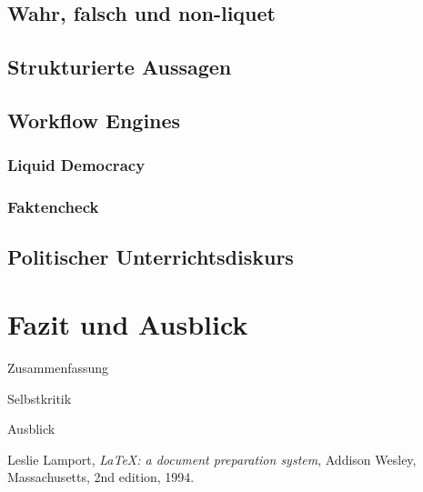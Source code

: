\documentclass[11pt,a4paper,bibtotocnumbered]{scrreprt}
\begin{document}
\section{Wahr, falsch und non-liquet} %

\section{Strukturierte Aussagen} %

\section{Workflow Engines} %

\subsection{Liquid Democracy} %

\subsection{Faktencheck} %


\section{Politischer Unterrichtsdiskurs} %



\chapter{Fazit und Ausblick} %

Zusammenfassung

Selbstkritik

Ausblick

 







\begin{singlespace}
\begin{thebibliography}{9}

  Leslie Lamport,
  \emph{\LaTeX: a document preparation system},
  Addison Wesley, Massachusetts,
  2nd edition,
  1994.

\end{thebibliography}
\end{singlespace}
\end{document}
